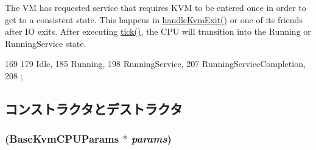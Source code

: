 \begin{Desc}
\begin{description}
The VM has requested service that requires KVM to be entered once in order to get to a consistent state. This happens in \hyperlink{classBaseKvmCPU_ab7dc26d4e02dbccc343942dd7a3ed7d8}{handleKvmExit()} or one of its friends after IO exits. After executing \hyperlink{classBaseKvmCPU_a873dd91783f9efb4a590aded1f70d6b0}{tick()}, the CPU will transition into the Running or RunningService state. \end{description}
\end{Desc}




\begin{DoxyCode}
169                 {
179         Idle,
185         Running,
198         RunningService,
207         RunningServiceCompletion,
208     };
\end{DoxyCode}


\subsection{コンストラクタとデストラクタ}
\hypertarget{classBaseKvmCPU_a9eb0b030bd0367a335c97b465d98f01c}{
\subsubsection[{BaseKvmCPU}]{ (BaseKvmCPUParams $\ast$ {\em params})}}
\label{classBaseKvmCPU_a9eb0b030bd0367a335c97b465d98f01c}




